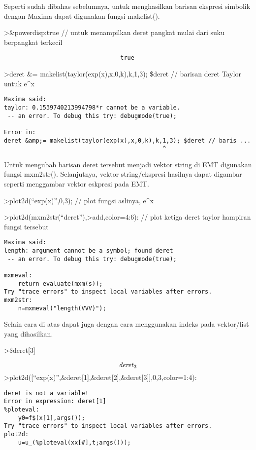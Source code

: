 \documentclass[
]{book}
\begin{document}
Seperti sudah dibahas sebelumnya, untuk menghasilkan barisan ekspresi simbolik dengan Maxima dapat digunakan fungsi makelist().

\textgreater\&powerdisp:true // untuk menampilkan deret pangkat mulai dari suku berpangkat terkecil

\begin{verbatim}
                                 true
\end{verbatim}

\textgreater deret \&= makelist(taylor(exp(x),x,0,k),k,1,3); \$deret // barisan deret Taylor untuk e\^{}x

\begin{verbatim}
Maxima said:
taylor: 0.1539740213994798*r cannot be a variable.
 -- an error. To debug this try: debugmode(true);

Error in:
deret &amp;= makelist(taylor(exp(x),x,0,k),k,1,3); $deret // baris ...
                                             ^
\end{verbatim}

Untuk mengubah barisan deret tersebut menjadi vektor string di EMT digunakan fungsi mxm2str(). Selanjutnya, vektor string/ekspresi hasilnya dapat digambar seperti menggambar vektor eskpresi pada EMT.

\textgreater plot2d(``exp(x)'',0,3); // plot fungsi aslinya, e\^{}x

\textgreater plot2d(mxm2str(``deret''),\textgreater add,color=4:6): // plot ketiga deret taylor hampiran fungsi tersebut

\begin{verbatim}
Maxima said:
length: argument cannot be a symbol; found deret
 -- an error. To debug this try: debugmode(true);

mxmeval:
    return evaluate(mxm(s));
Try "trace errors" to inspect local variables after errors.
mxm2str:
    n=mxmeval("length(VVV)");
\end{verbatim}

Selain cara di atas dapat juga dengan cara menggunakan indeks pada vektor/list yang dihasilkan.

\textgreater\$deret{[}3{]}

\[{\it deret}_{3}\]\textgreater plot2d({[}``exp(x)'',\&deret{[}1{]},\&deret{[}2{]},\&deret{[}3{]}{]},0,3,color=1:4):

\begin{verbatim}
deret is not a variable!
Error in expression: deret[1]
%ploteval:
    y0=f$(x[1],args());
Try "trace errors" to inspect local variables after errors.
plot2d:
    u=u_(%ploteval(xx[#],t;args()));
\end{verbatim}
\end{document}
